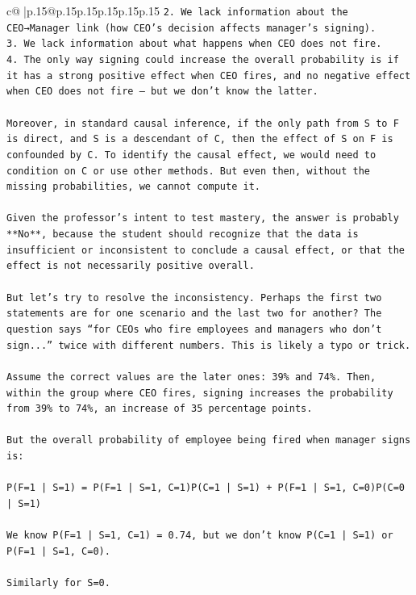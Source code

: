\documentclass{article}
\begin{document}
{\begin{supertabular}{c@{$\;$}|p{.15\linewidth}@{}p{.15\linewidth}p{.15\linewidth}p{.15\linewidth}p{.15\linewidth}p{.15\linewidth}}
{{{\texttt{2. We lack information about the CEO→Manager link (how CEO’s decision affects manager’s signing).} \\
\texttt{3. We lack information about what happens when CEO does not fire.} \\
\texttt{4. The only way signing could increase the overall probability is if it has a strong positive effect when CEO fires, and no negative effect when CEO does not fire — but we don’t know the latter.} \\
\\ 
\texttt{Moreover, in standard causal inference, if the only path from S to F is direct, and S is a descendant of C, then the effect of S on F is confounded by C. To identify the causal effect, we would need to condition on C or use other methods. But even then, without the missing probabilities, we cannot compute it.} \\
\\ 
\texttt{Given the professor’s intent to test mastery, the answer is probably **No**, because the student should recognize that the data is insufficient or inconsistent to conclude a causal effect, or that the effect is not necessarily positive overall.} \\
\\ 
\texttt{But let’s try to resolve the inconsistency. Perhaps the first two statements are for one scenario and the last two for another? The question says “for CEOs who fire employees and managers who don’t sign...” twice with different numbers. This is likely a typo or trick.} \\
\\ 
\texttt{Assume the correct values are the later ones: 39\% and 74\%. Then, within the group where CEO fires, signing increases the probability from 39\% to 74\%, an increase of 35 percentage points.} \\
\\ 
\texttt{But the overall probability of employee being fired when manager signs is:} \\
\\ 
\texttt{P(F=1 | S=1) = P(F=1 | S=1, C=1)P(C=1 | S=1) + P(F=1 | S=1, C=0)P(C=0 | S=1)} \\
\\ 
\texttt{We know P(F=1 | S=1, C=1) = 0.74, but we don’t know P(C=1 | S=1) or P(F=1 | S=1, C=0).} \\
\\ 
\texttt{Similarly for S=0.} \\
\\ 
}}}
\end{supertabular}}
\end{document}

